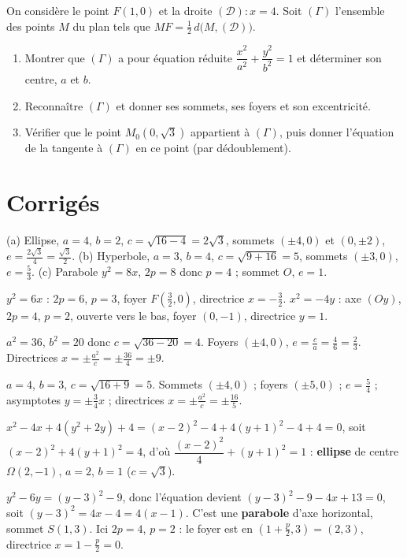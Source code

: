 On considère le point $F(1,0)$ et la droite $(\mathcal D):x=4$. Soit $(\Gamma)$ l'ensemble
des points $M$ du plan tels que $MF=\tfrac12\,d\big(M,(\mathcal D)\big)$.
\begin{enumerate}[label=\arabic*)]
\item Montrer que $(\Gamma)$ a pour équation réduite $\dfrac{x^{2}}{a^{2}}+\dfrac{y^{2}}{b^{2}}=1$
et déterminer son centre, $a$ et $b$.
\item Reconnaître $(\Gamma)$ et donner ses sommets, ses foyers et son excentricité.
\item Vérifier que le point $M_0\!\left(0,\sqrt3\right)$ appartient à $(\Gamma)$, puis
donner l'équation de la tangente à $(\Gamma)$ en ce point (par dédoublement).
\end{enumerate}

\section{Corrigés}

(a) Ellipse, $a=4$, $b=2$, $c=\sqrt{16-4}=2\sqrt3$, sommets $(\pm4,0)$ et $(0,\pm2)$,
$e=\tfrac{2\sqrt3}{4}=\tfrac{\sqrt3}{2}$.\;
(b) Hyperbole, $a=3$, $b=4$, $c=\sqrt{9+16}=5$, sommets $(\pm3,0)$, $e=\tfrac53$.\;
(c) Parabole $y^2=8x$, $2p=8$ donc $p=4$ ; sommet $O$, $e=1$.

$y^{2}=6x$ : $2p=6$, $p=3$, foyer $F\!\left(\tfrac32,0\right)$, directrice $x=-\tfrac32$.\;
$x^{2}=-4y$ : axe $(Oy)$, $2p=4$, $p=2$, ouverte vers le bas, foyer $\left(0,-1\right)$,
directrice $y=1$.

$a^{2}=36$, $b^{2}=20$ donc $c=\sqrt{36-20}=4$. Foyers $(\pm4,0)$,
$e=\tfrac{c}{a}=\tfrac{4}{6}=\tfrac23$. Directrices $x=\pm\tfrac{a^{2}}{c}=\pm\tfrac{36}{4}=\pm9$.

$a=4$, $b=3$, $c=\sqrt{16+9}=5$. Sommets $(\pm4,0)$ ; foyers $(\pm5,0)$ ;
$e=\tfrac54$ ; asymptotes $y=\pm\tfrac34 x$ ; directrices $x=\pm\tfrac{a^{2}}{c}=\pm\tfrac{16}{5}$.

$x^{2}-4x+4(y^{2}+2y)+4=(x-2)^{2}-4+4(y+1)^{2}-4+4=0$, soit
$(x-2)^{2}+4(y+1)^{2}=4$, d'où $\dfrac{(x-2)^{2}}{4}+(y+1)^{2}=1$ : \textbf{ellipse}
de centre $\Omega(2,-1)$, $a=2$, $b=1$ ($c=\sqrt3$).

$y^{2}-6y=(y-3)^{2}-9$, donc l'équation devient $(y-3)^{2}-9-4x+13=0$, soit
$(y-3)^{2}=4x-4=4(x-1)$. C'est une \textbf{parabole} d'axe horizontal, sommet
$S(1,3)$. Ici $2p=4$, $p=2$ : le foyer est en $\left(1+\tfrac p2,3\right)=(2,3)$,
directrice $x=1-\tfrac p2=0$.

